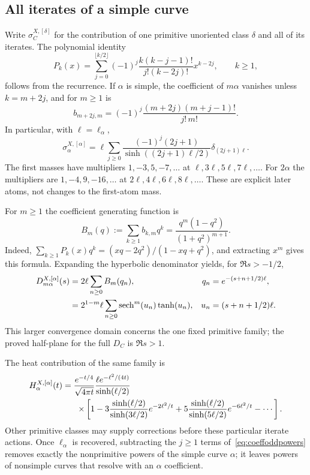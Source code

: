 \subsection{All iterates of a simple curve}

Write $\sigma_C^{X,[\delta]}$ for the contribution of one primitive
unoriented class $\delta$ and all of its iterates. The polynomial
identity
\begin{equation}
 P_k(x)=\sum_{j=0}^{\lfloor k/2\rfloor}
 (-1)^j\frac{k(k-j-1)!}{j!(k-2j)!}x^{k-2j},\qquad k\geq1,
 \label{eq:coeffChebyshev}
\end{equation}
follows from the recurrence. If $\alpha$ is simple, the coefficient
of $m\alpha$ vanishes unless $k=m+2j$, and for $m\geq1$ is
\begin{equation}
 b_{m+2j,m}=(-1)^j
  \frac{(m+2j)(m+j-1)!}{j!\,m!}.
 \label{eq:coeffsimplepowers}
\end{equation}
In particular, with $\ell=\ell_\alpha$,
\begin{equation}
 \boxed{
 \sigma_\alpha^{X,[\alpha]}
 =\ell\sum_{j\geq0}
   \frac{(-1)^j(2j+1)}{\sinh((2j+1)\ell/2)}
   \delta_{(2j+1)\ell}.
 }
 \label{eq:coeffoddpowers}
\end{equation}
The first masses have multipliers $1,-3,5,-7,\ldots$ at
$\ell,3\ell,5\ell,7\ell,\ldots$. For $2\alpha$ the multipliers
are $1,-4,9,-16,\ldots$ at $2\ell,4\ell,6\ell,8\ell,\ldots$.
These are explicit later atoms, not changes to the first-atom mass.

For $m\geq1$ the coefficient generating function is
\begin{equation}
 B_m(q):=\sum_{k\geq1}b_{k,m}q^k
 =\frac{q^m(1-q^2)}{(1+q^2)^{m+1}}.
 \label{eq:coeffpowergenerating}
\end{equation}
Indeed,
$\sum_{k\geq1}P_k(x)q^k=(xq-2q^2)/(1-xq+q^2)$,
and extracting $x^m$ gives this formula. Expanding the hyperbolic
denominator yields, for $\Re s>-1/2$,
\begin{align}
 D_{m\alpha}^{X,[\alpha]}(s)
 &=2\ell\sum_{n\geq0}B_m(q_n),
 &q_n&=e^{-(s+n+1/2)\ell},\notag\\
 &=2^{1-m}\ell\sum_{n\geq0}
   \operatorname{sech}^m(u_n)\tanh(u_n),
 &u_n&=(s+n+1/2)\ell.
 \label{eq:coeffpowerLaplace}
\end{align}
This larger convergence domain concerns the one fixed primitive
family; the proved half-plane for the full $D_C$ is $\Re s>1$.

The heat contribution of the same family is
\begin{align}
 H_\alpha^{X,[\alpha]}(t)
 ={}&\frac{e^{-t/4}}{\sqrt{4\pi t}}
 \frac{\ell e^{-\ell^2/(4t)}}{\sinh(\ell/2)}\notag\\
 &\mathrel{}\times\left[
 1-3\frac{\sinh(\ell/2)}{\sinh(3\ell/2)}e^{-2\ell^2/t}
 +5\frac{\sinh(\ell/2)}{\sinh(5\ell/2)}e^{-6\ell^2/t}
 -\cdots\right].
 \label{eq:coeffpowerheat}
\end{align}
Other primitive classes may supply corrections before these particular
iterate actions. Once $\ell_\alpha$ is recovered, subtracting the
$j\geq1$ terms of~\eqref{eq:coeffoddpowers} removes exactly the
nonprimitive powers of the simple curve $\alpha$; it leaves powers
of nonsimple curves that resolve with an $\alpha$ coefficient.


